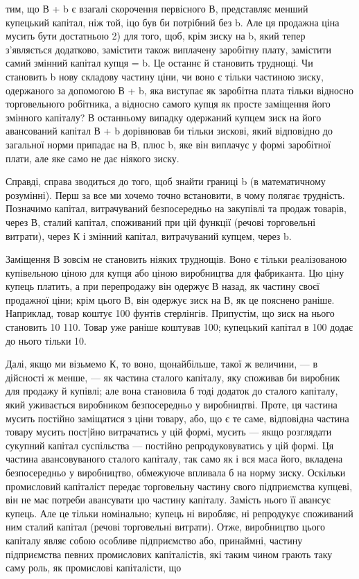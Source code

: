 тим, що В + b є взагалі скорочення первісного В, представляє
менший купецький капітал, ніж той, іцо був би потрібний без b.
Але ця продажна ціна мусить бути достатньою 2) для того, щоб,
крім зиску на b, який тепер з’являється додатково, замістити також
виплачену заробітну плату, замістити самий змінний капітал
купця = b. Це останнє й становить труднощі. Чи становить b
нову складову частину ціни, чи воно є тільки частиною зиску,
одержаного за допомогою В + b, яка виступає як заробітна плата
тільки відносно торговельного робітника, а відносно самого
купця як просте заміщення його змінного капіталу? В останньому
випадку одержаний купцем зиск на його авансований капітал
В + b дорівнював би тільки зискові, який відповідно до загальної
норми припадає на В, плюс b, яке він виплачує у формі
заробітної плати, але яке само не дає ніякого зиску.

Справді, справа зводиться до того, щоб знайти границі b (в математичному
розумінні). Перш за все ми хочемо точно встановити,
в чому полягає трудність. Позначимо капітал, витрачуваний безпосередньо
на закупівлі та продаж товарів, через В, сталий капітал,
споживаний при цій функції (речові торговельні витрати),
через К і змінний капітал, витрачуваний купцем, через b.

Заміщення В зовсім не становить ніяких труднощів. Воно є
тільки реалізованою купівельною ціною для купця або ціною
виробництва для фабриканта. Цю ціну купець платить, а при
перепродажу він одержує В назад, як частину своєї продажної
ціни; крім цього В, він одержує зиск на В, як це пояснено раніше.
Наприклад, товар коштує 100 фунтів стерлінгів. Припустім, що зиск
на нього становить 10%
110. Товар уже раніше коштував 100; купецький капітал в 100
додає до нього тільки 10.

Далі, якщо ми візьмемо К, то воно, щонайбільше, такої ж
величини, — в дійсності ж менше, — як частина сталого капіталу,
яку споживав би виробник для продажу й купівлі; але вона становила
б тоді додаток до сталого капіталу, який уживається виробником
безпосередньо у виробництві. Проте, ця частина мусить
постійно заміщатися з ціни товару, або, що є те саме, відповідна
частина товару мусить пост|йно витрачатись у цій формі, мусить
— якщо розглядати сукупний капітал суспільства — постійно
репродуковуватись у цій формі. Ця частина авансовуваного сталого
капіталу, так само як і вся маса його, вкладена безпосередньо
у виробництво, обмежуюче впливала б на норму зиску. Оскільки
промисловий капіталіст передає торговельну частину свого підприємства
купцеві, він не має потреби авансувати цю частину
капіталу. Замість нього її авансує купець. Але це тільки номінально;
купець ні виробляє, ні репродукує споживаний ним сталий
капітал (речові торговельні витрати). Отже, виробництво
цього капіталу являє собою особливе підприємство або, принаймні,
частину підприємства певних промислових капіталістів, які таким
чином грають таку саму роль, як промислові капіталісти, що

